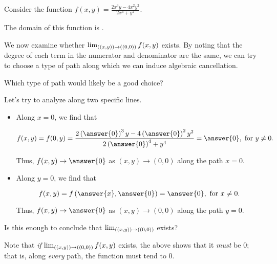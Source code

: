 \documentclass{ximera}
\author{Jim Talamo}
\begin{document}
\begin{exercise}
 
Consider the function $f(x,y) = \frac{2x^3y-4x^2y^2}{2x^4+y^4}$.

The domain of this function is .

We now examine whether $\lim_{\left((x,y)\right) \to \left((0,0)\right)} f(x,y)$ exists.  By noting that the degree of each term in the numerator and denominator are the same, we can try to choose a type of path along which we can induce algebraic cancellation.

Which type of path would likely be a good choice?

\begin{multipleChoice}
\end{multipleChoice}

\begin{exercise}
Let's try to analyze along two specific lines.

\begin{itemize}
\item Along $x=0$, we find that 

\[
f(x,y) = f(0,y) =\frac{2\left(\answer{0}\right)^3y-4\left(\answer{0}\right)^2y^2}{2\left(\answer{0}\right)^4+y^4} = \answer{0}, \textrm{ for } y \neq 0.
\]

Thus, $f(x,y) \to \answer{0}$ as $(x,y) \to (0,0)$ along the path $x=0$.

\item Along $y=0$, we find that 

\[
f(x,y) = f\left(\answer{x},\answer{0}\right) = \answer{0} , \textrm{ for } x \neq 0.
\]

Thus, $f(x,y) \to \answer{0}$ as $(x,y) \to (0,0)$ along the path $y=0$.
\end{itemize}

Is this enough to conclude that $\lim_{\left((x,y)\right) \to \left((0,0)\right)}$ exists?

\begin{multipleChoice}
\end{multipleChoice}

\begin{exercise}
Note that \emph{if} $\lim_{\left((x,y)\right) \to \left((0,0)\right)} f(x,y)$ exists, the above shows that it \emph{must} be $0$; that is, along \emph{every} path, the function must tend to $0$.


\end{exercise}
\end{exercise}
\end{exercise}
\end{document}
